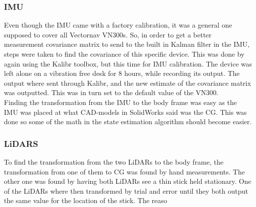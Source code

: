 \subsubsection{IMU}

Even though the IMU came with a factory calibration, it was a general one supposed to cover all Vectornav VN300s. So, in order to get a better measurement covariance matrix to send to the built in Kalman filter in the IMU, steps were taken to find the covariance of this specific device. This was done by again using the Kalibr toolbox, but this time for IMU calibration. The device was left alone on a vibration free desk for 8 hours, while recording its output. The output where sent through Kalibr, and the new estimate of the covariance matrix was outputted. This was in turn set to the default value of the VN300. \\

Finding the transformation from the IMU to the body frame was easy as the IMU was placed at what CAD-models in SolidWorks said was the CG. This was done so some of the math in the state estimation algorithm should become easier.

\subsubsection{LiDARS}

To find the transformation from the two LiDARs to the body frame, the transformation from one of them to CG was found by hand measurements. The other one was found by having both LiDARs see a thin stick held stationary. One of the LiDARs where then transformed by trial and error until they both output the same value for the location of the stick. The reaso